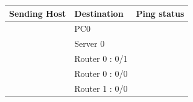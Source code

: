 \documentclass[a4paper,11pt]{article}
\begin{document}
\begin{enumerate}
\begin{enumerate}

                    \begin{table}[H]
                        \centering
                        \begin{tabular}{| m{9em}| m{12em}| m{9em} |}
                            \hline
                            \textbf{Sending Host}                                           & \textbf{Destination} & \textbf{Ping status}                                                     \\
                            \hline
                            {\cellcolor[rgb]{0.333,0.686,1}}                                & PC0                  & {\cellcolor[rgb]{0.365,1,0.741}}                                         \\
                            \hhline{|>{\arrayrulecolor[rgb]{0.333,0.686,1}}->{\arrayrulecolor{black}}->{\arrayrulecolor[rgb]{0.365,1,0.741}}->{\arrayrulecolor{black}}|}
                            {\cellcolor[rgb]{0.333,0.686,1}}                                & Server 0             & {\cellcolor[rgb]{0.365,1,0.741}}                                         \\
                            \hhline{|>{\arrayrulecolor[rgb]{0.333,0.686,1}}->{\arrayrulecolor{black}}->{\arrayrulecolor[rgb]{0.365,1,0.741}}->{\arrayrulecolor{black}}|}
                            {\cellcolor[rgb]{0.333,0.686,1}}                                & Router 0 : 0/1       & {\cellcolor[rgb]{0.365,1,0.741}}                                         \\
                            \hhline{|>{\arrayrulecolor[rgb]{0.333,0.686,1}}->{\arrayrulecolor{black}}->{\arrayrulecolor[rgb]{0.365,1,0.741}}->{\arrayrulecolor{black}}|}
                            {\cellcolor[rgb]{0.333,0.686,1}}                                & Router 0 : 0/0       & {\cellcolor[rgb]{0.365,1,0.741}}                                         \\
                            \hhline{|>{\arrayrulecolor[rgb]{0.333,0.686,1}}->{\arrayrulecolor{black}}->{\arrayrulecolor[rgb]{0.365,1,0.741}}->{\arrayrulecolor{black}}|}
                            {\cellcolor[rgb]{0.333,0.686,1}}                                & Router 1 : 0/0       & {\cellcolor[rgb]{0.365,1,0.741}}                                         \\

\end{tabular}
\end{table}
\end{enumerate}
\end{enumerate}
\end{document}
